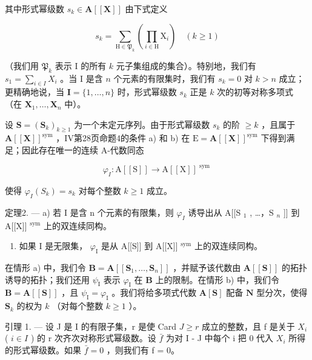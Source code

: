 其中形式幂级数 \(s_k \in \mathbf{A}[[\mathbf{X}]]\) 由下式定义

\[
s _ {k} = \sum_ {\mathrm{H} \in \mathfrak {P} _ {k}} \left(\prod_ {i \in \mathrm{H}} \mathrm{X} _ {i}\right) \quad (k \geqslant 1)\tag{15}
\]

（我们用 \(\mathfrak{P}_k\) 表示 I 的所有 \(k\) 元子集组成的集合）。特别地，我们有 \(s_1 = \sum_{i \in I} X_i\) 。当 I 是含 \(n\) 个元素的有限集时，我们有 \(s_k = 0\) 对 \(k > n\) 成立；更精确地说，当 \(\mathbf{I} = \{1,\dots,n\}\) 时，形式幂级数 \(s_k\) 正是 \(k\) 次的初等对称多项式（在 \(\mathbf{X}_1,\ldots,\mathbf{X}_n\) 中）。

设 \(\mathbf{S} = (\mathbf{S}_k)_{k\geqslant 1}\) 为一个未定元序列。由于形式幂级数 \(s_k\) 的阶 \(\geqslant k\) ，且属于 \(\mathbf{A}[[\mathbf{X}]]^{\mathrm{sym}}\) ，IV第28页命题4的条件 a) 和 b) 在 \(\mathrm{E} = \mathbf{A}[[\mathbf{X}]]^{\mathrm{sym}}\) 下得到满足；因此存在唯一的连续 A-代数同态

\[
\varphi_ {I}: \mathrm{A} [ [ \mathrm{S} ] ] \rightarrow \mathrm{A} [ [ \mathrm{X} ] ] ^ {\text { sym }}
\]

使得 \(\varphi_{I}(S_{k}) = s_{k}\) 对每个整数 \(k\geqslant 1\) 成立。

定理2. --- a) 若 I 是含 n 个元素的有限集，则 \(\varphi_{I}\) 诱导出从 A{[}{[}S \(_{1}\) , \ldots，S \(_{n}\) {]}{]} 到 A{[}{[}X{]}{]} \(^{\text{sym}}\) 上的双连续同构。

\begin{enumerate}
\def\labelenumi{\alph{enumi})}
\setcounter{enumi}{1}
\tightlist
\item
  如果 I 是无限集， \(\varphi_{\mathrm{I}}\) 是从 A{[}{[}S{]}{]} 到 A{[}{[}X{]}{]} \(^{\mathrm{sym}}\) 上的双连续同构。
\end{enumerate}

在情形 a) 中，我们令 \(\mathbf{B} = \mathbf{A}[[\mathbf{S}_1, \ldots, \mathbf{S}_n]]\) ，并赋予该代数由 \(\mathbf{A}[[\mathbf{S}]]\) 的拓扑诱导的拓扑；我们还用 \(\psi_{\mathrm{I}}\) 表示 \(\varphi_{\mathrm{I}}\) 在 \(\mathbf{B}\) 上的限制。在情形 b) 中，我们令 \(\mathbf{B} = \mathbf{A}[[\mathbf{S}]]\) ，且 \(\psi_{\mathrm{I}} = \varphi_{\mathrm{I}}\) 。我们将给多项式代数 \(\mathbf{A}[\mathbf{S}]\) 配备 \(\mathbf{N}\) 型分次，使得 \(\mathbf{S}_k\) 的权为 \(k\) （对每个整数 \(k \geqslant 1\) ）。

引理 1. --- 设 J 是 I 的有限子集，r 是使 Card \(J \geqslant r\) 成立的整数，且 f 是关于 \(X_{i}\) ( \(i \in I\) ) 的 r 次齐次对称形式幂级数。设 \(\bar{f}\) 为对 I - J 中每个 i 把 0 代入 \(X_{i}\) 所得的形式幂级数。如果 \(\bar{f} = 0\) ，则我们有 f = 0。

